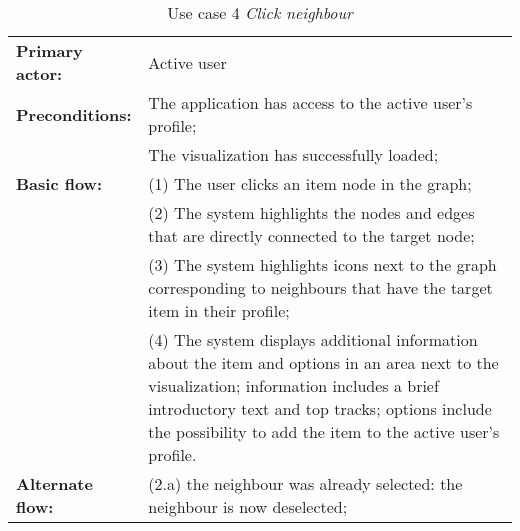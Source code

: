 \begin{table}[h]
\caption{Use case 4 \textit{Click neighbour}}
\begin{center}
	\begin{tabular}{ l p{300px} }
		\hline
		\textbf{Primary actor:}	& Active user \\
		
		\textbf{Preconditions:}	& The application has access to the active user's profile; \\
														& The visualization has successfully loaded; \\
		
		\textbf{Basic flow:}	& (1) The user clicks an item node in the graph; \\
													& (2) The system highlights the nodes and edges that are directly connected to the target node; \\
													& (3) The system highlights icons next to the graph corresponding to neighbours that have the target item in their profile; \\
													& (4) The system displays additional information about the item and options in an area next to the visualization; information includes a brief introductory text and top tracks; options include the possibility to add the item to the active user's profile. \\
		
		\textbf{Alternate flow:}	& (2.a) the neighbour was already selected: the neighbour is now deselected; \\
		
		\hline
	\end{tabular}
\end{center}
\label{tab:use_case4}
\end{table}

